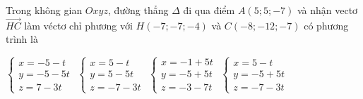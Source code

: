 \documentclass[12pt,a4paper]{article}
\begin{document}
\begin{ex}
 Trong không gian ${Oxyz}$, đường thẳng ${\Delta}$ đi qua điểm ${A(5;5;-7)}$ và nhận vectơ $\overrightarrow{HC}$ làm véctơ chỉ phương với $H(-7;-7;-4)$ và $C(-8;-12;-7)$ có phương trình là
 
\choice
{ $\left\{ \begin{array}{l}x = -5-t\\ y = -5-5t\\z = 7-3t\end{array} \right.$ }
   { \True $\left\{ \begin{array}{l}x = 5-t\\ y = 5-5t\\z = -7-3t\end{array} \right.$ }
     { $\left\{ \begin{array}{l}x = -1+5t\\ y = -5+5t\\z = -3-7t\end{array} \right.$ }
    { $\left\{ \begin{array}{l}x = 5-t\\ y = -5+5t\\z = -7-3t\end{array} \right.$ }
\end{ex}
\end{document}
